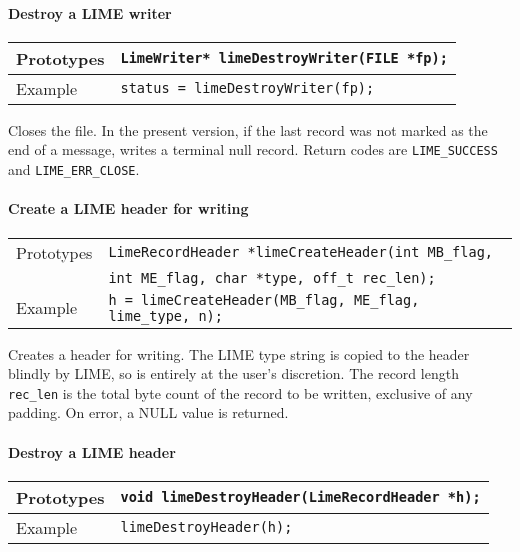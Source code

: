 \documentclass{article}
\begin{document}
\paragraph{Destroy a LIME writer}
%
\begin{flushleft}
  \begin{tabular}{|l|l|}
  \hline
  Prototypes     & \verb|LimeWriter* limeDestroyWriter(FILE *fp);| \\
\hline
  Example  & \verb|status = limeDestroyWriter(fp);| \\
   \hline
 \end{tabular}
\end{flushleft}
%
Closes the file.  In the present version, if the last record was not
marked as the end of a message, writes a terminal null record.  Return
codes are {\tt LIME\_SUCCESS} and {\tt LIME\_ERR\_CLOSE}.

\paragraph{Create a LIME header for writing}
%
\begin{flushleft}
  \begin{tabular}{|l|l|}
  \hline
  Prototypes     & \verb|LimeRecordHeader *limeCreateHeader(int MB_flag,| \\
                 & \verb|int ME_flag, char *type, off_t rec_len);| \\
\hline
  Example  & \verb|h = limeCreateHeader(MB_flag, ME_flag, lime_type, n);| \\
   \hline
 \end{tabular}
\end{flushleft}
%
Creates a header for writing.  The LIME type string is copied to the
header blindly by LIME, so is entirely at the user's discretion.  The
record length \verb|rec_len| is the total byte count of the record to
be written, exclusive of any padding.  On error, a NULL value is
returned.

\paragraph{Destroy a LIME header}
%
\begin{flushleft}
  \begin{tabular}{|l|l|}
  \hline
  Prototypes     & \verb|void limeDestroyHeader(LimeRecordHeader *h);| \\
\hline
  Example  & \verb|limeDestroyHeader(h);| \\
   \hline
 \end{tabular}
\end{flushleft}
%
\end{document}
